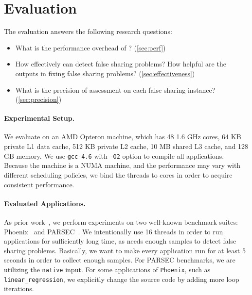 \section{Evaluation}
\label{sec:eval}

\sloppy{}
The evaluation answers the following research questions: 

\begin{itemize}
\item What is the performance overhead of \cheetah{}? (\ref{sec:perf})

\item How effectively can \cheetah{} detect false sharing problems? How helpful are the outputs in fixing false sharing problems? (\ref{sec:effectiveness})

\item What is the precision of assessment on each false sharing instance? (\ref{sec:precision})

\end{itemize}

\paragraph{Experimental Setup.} We evaluate \cheetah{} on an AMD Opteron machine, which has 48 1.6 GHz cores, 64 KB private L1 data cache, 512 KB private L2 cache, 10 MB shared L3 cache, and 128 GB memory. We use \texttt{gcc-4.6} with {\tt -O2} option to compile all applications. Because the machine is a NUMA machine, and the performance may vary with different scheduling policies, we bind the threads to cores in order to acquire consistent performance.   

\paragraph{Evaluated Applications.} As prior work~\cite{Sheriff, Predator, qinzhao, mldetect}, we perform experiments on two well-known benchmark suites: Phoenix~\cite{phoenix-hpca} and PARSEC~\cite{parsec}. We intentionally use 16 threads in order to run applications for sufficiently long  time, as \cheetah{} needs enough samples to detect false sharing problems.  Basically, we want to make every application run for at least 5 seconds in order to collect enough samples. For PARSEC benchmarks, we are utilizing the \texttt{native} input. For some applications of \texttt{Phoenix}, such as \texttt{linear\_regression}, we explicitly change the source code by adding more loop iterations. 

